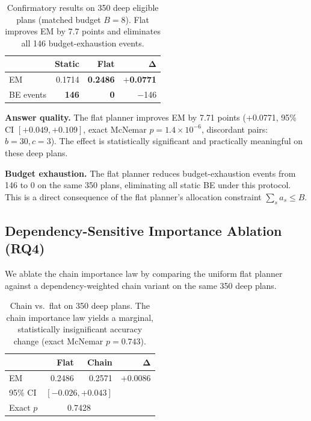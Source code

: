 \begin{table}[t]
\centering\small
\begin{tabular}{lrrr}
\toprule
& \textbf{Static} & \textbf{Flat} & $\boldsymbol{\Delta}$ \\
\midrule
EM & 0.1714 & \textbf{0.2486} & $+$\textbf{0.0771} \\
BE events & \textbf{146} & \textbf{0} & $-$146 \\
\bottomrule
\end{tabular}
\caption{Confirmatory results on 350 deep eligible plans (matched budget $B = 8$). Flat improves EM by 7.7 points and eliminates all 146 budget-exhaustion events.}
\label{tab:deep}
\end{table}

\noindent \textbf{Answer quality.} The flat planner improves EM by 7.71 points ($+$0.0771, 95\% CI $[+0.049, +0.109]$, exact McNemar $p = 1.4 \times 10^{-6}$, discordant pairs: $b = 30, c = 3$). The effect is statistically significant and practically meaningful on these deep plans.

\noindent \textbf{Budget exhaustion.} The flat planner reduces budget-exhaustion events from 146 to 0 on the same 350 plans, eliminating all static BE under this protocol. This is a direct consequence of the flat planner's allocation constraint $\sum_s a_s \leq B$.

\subsection{Dependency-Sensitive Importance Ablation (RQ4)}\label{sec:results:ablation}

We ablate the chain importance law by comparing the uniform flat planner against a dependency-weighted chain variant on the same 350 deep plans.

\begin{table}[t]
\centering\small
\begin{tabular}{lrrr}
\toprule
& \textbf{Flat} & \textbf{Chain} & $\boldsymbol{\Delta}$ \\
\midrule
EM & 0.2486 & 0.2571 & $+$0.0086 \\
95\% CI & \multicolumn{2}{c}{$[-0.026, +0.043]$} \\
Exact $p$ & \multicolumn{2}{c}{0.7428} \\
\bottomrule
\end{tabular}
\caption{Chain vs.\ flat on 350 deep plans. The chain importance law yields a marginal, statistically insignificant accuracy change (exact McNemar $p = 0.743$).}
\label{tab:ablation}
\end{table}

